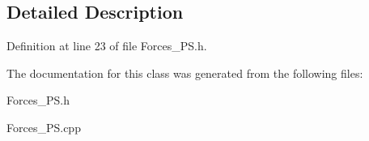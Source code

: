 \subsection{Detailed Description}


Definition at line 23 of file Forces\+\_\+\+P\+S.\+h.



The documentation for this class was generated from the following files\+:\begin{DoxyCompactItemize}
\item 
Forces\+\_\+\+P\+S.\+h\item 
Forces\+\_\+\+P\+S.\+cpp\end{DoxyCompactItemize}
